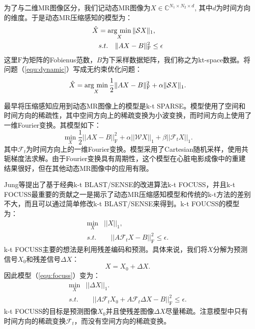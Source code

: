 为了与二维MR图像区分，我们记动态MR图像为$X\in \mathbb{C}^{N_1\times N_2\times d}$, 其中$d$为时间方向的维度。于是动态MR压缩感知的模型为：
\begin{equation}
\begin{aligned}
	\hat{X}&=\argmin_X \|\mathcal{S}X\|_1,\\
	&s.t.\quad \|AX-B\|_\mathrm{F}^2 \leq \epsilon
\end{aligned}
\label{equ:dynamic}
\end{equation}
这里$\mathrm{F}$为矩阵的Fobienus范数，$B$为下采样数据矩阵，我们称之为kt-space数据。将问题（\ref{equ:dynamic}）写成无约束优化问题：
\begin{equation}
	\hat{X}=\argmin_X \frac{1}{2}\|AX-B\|_\mathrm{F}^2+\alpha\|\mathcal{S}X\|_1.
\label{equ:dunconstraint}
\end{equation}

最早将压缩感知应用到动态MR图像上的模型是k-t SPARSE\cite{lustig2006}。模型使用了空间和时间方向的稀疏性，其中空间方向上的稀疏变换为小波变换，而时间方向上使用了一维Fourier变换。其模型如下：
\begin{equation}
	\min_X\frac{1}{2}||AX-B||_\mathrm{F}^2 + \alpha||\mathcal{W}X||_1 + \beta||\mathcal{F}_tX||_1.
\end{equation}
其中$\mathcal{F}_t$为时间方向上的一维Fourier变换。模型采用了Cartesian随机采样，使用共轭梯度法求解。由于Fourier变换具有周期性，这个模型在心脏电影成像中的重建结果很好，但在其他动态MR图像中的应用有限。

Jung等提出了基于经典k-t BLAST/SENSE\cite{Jeffrey2003k}的改进算法k-t FOCUSS\cite{focuss,jung2007improved}，并且k-t FOCUSS最重要的贡献之一是揭示了动态MR压缩感知模型和传统的k-t方法的差别不大，而且可以通过简单修改k-t BLAST/SENSE来得到。k-t FOUCSS的模型为：
\begin{equation}
\begin{aligned}
		\min_X &||X||_1,\\ 
		s.t.&\quad ||A\mathcal{F}_tX-B||_\mathrm{F}^2\leq \epsilon.
\end{aligned}
\label{equ:focuss}
\end{equation}
k-t FOCUSS主要的想法是利用残差编码和预测。具体来说，我们将$X$分解为预测信号$X_0$和残差信号$\Delta X$：
\begin{equation*}
	X=X_0+\Delta X.
\end{equation*}
因此模型（\ref{equ:focuss}）变为：
\begin{equation}
\begin{aligned}
		\min_X &||\Delta X||_1.\\ 
		s.t.&\quad ||A\mathcal{F}_tX_0+A\mathcal{F}_t\Delta X-B||_\mathrm{F}^2\leq \epsilon.
\end{aligned}
\end{equation}
k-t FOCUSS的目标是预测图像$X_0$并且使残差图像$\Delta X$尽量稀疏。注意模型中只有时间方向的稀疏变换$\mathcal{F}_t$，而没有空间方向的稀疏变换。

